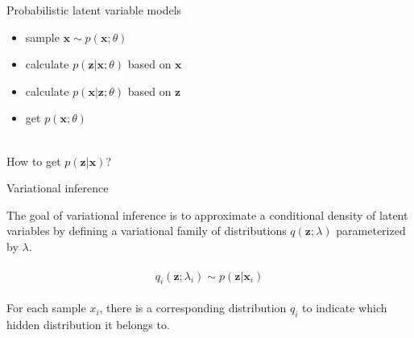 \documentclass{beamer}		%
\begin{document}
\begin{frame}{Probabilistic latent variable models}

\begin{itemize}
    \item sample $\bm{x} \sim p(\bm{x};\theta)$
    \item calculate $p(\bm{z}|\bm{x};\theta)$ based on $\bm{x}$
    \item calculate $p(\bm{x}|\bm{z};\theta)$ based on $\bm{z}$
    \item get $p(\bm{x};\theta)$
\end{itemize}

\pause
~\\
How to get $p(\bm{z}|\bm{x})$?

\end{frame}



\begin{frame}{Variational inference}

The goal of variational inference is to approximate a conditional density of latent variables by defining a variational family of distributions $q(\bm{z};\lambda)$ parameterized by $\lambda$.

\begin{eqnarray*}
\begin{aligned}
q_i(\bm{z};\lambda_i) \sim p(\bm{z}|\bm{x}_i)
\end{aligned}    
\end{eqnarray*}

For each sample $x_i$, there is a corresponding distribution $q_i$ to indicate which hidden distribution it belongs to.

\end{frame}
\end{document}

